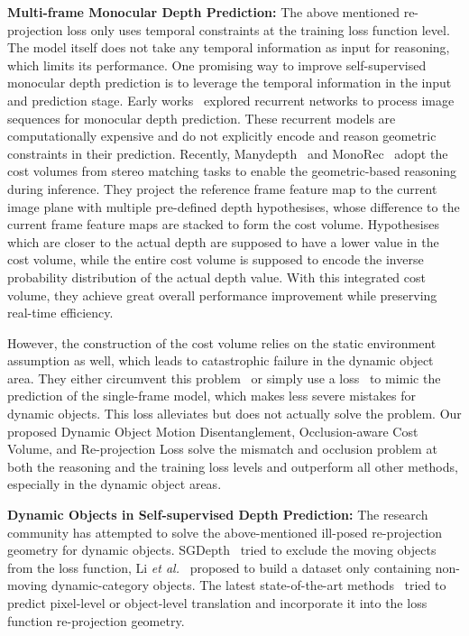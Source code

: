 \documentclass[runningheads]{llncs}
\newcommand{\etal}{\textit{et al.}}
\begin{document}
\textbf{Multi-frame Monocular Depth Prediction: }The above mentioned re-projection loss only uses temporal constraints at the training loss function level. The model itself does not take any temporal information as input for reasoning, which limits its performance. One promising way to improve self-supervised monocular depth prediction is to leverage the temporal information in the input and prediction stage. Early works~\cite{cs2018depthnet,patil2020dont,wang2019recurrent,zhang2019exploiting} explored recurrent networks to process image sequences for monocular depth prediction. These recurrent models are computationally expensive and do not explicitly encode and reason geometric constraints in their prediction. Recently, Manydepth~\cite{manydepth} and MonoRec~\cite{monorec} adopt the cost volumes from stereo matching tasks to enable the geometric-based reasoning during inference. They project the reference frame feature map to the current image plane with multiple pre-defined depth hypothesises, whose difference to the current frame feature maps are stacked to form the cost volume. Hypothesises which are closer to the actual depth are supposed to have a lower value in the cost volume, while the entire cost volume is supposed to encode the inverse probability distribution of the actual depth value. With this integrated cost volume, they achieve great overall performance improvement while preserving real-time efficiency. 

However, the construction of the cost volume relies on the static environment assumption as well, which leads to catastrophic failure in the dynamic object area. They either circumvent this problem~\cite{monorec} or simply use a  loss~\cite{manydepth} to mimic the prediction of the single-frame model, which makes less severe mistakes for dynamic objects. This  loss alleviates but does not actually solve the problem. Our proposed Dynamic Object Motion Disentanglement, Occlusion-aware Cost Volume, and Re-projection Loss solve the mismatch and occlusion problem at both the reasoning and the training loss levels and outperform all other methods, especially in the dynamic object areas.

\textbf{Dynamic Objects in Self-supervised Depth Prediction: }The research community has attempted to solve the above-mentioned ill-posed re-projection geometry for dynamic objects. SGDepth~\cite{sgdepth} tried to exclude the moving objects from the loss function, Li \etal~\cite{frozen} proposed to build a dataset only containing non-moving dynamic-category objects. The latest state-of-the-art methods~\cite{casser2018depth,gao2020attentional,gordon2019depth,instadm,lee2021attentive,li2020unsupervised} tried to predict pixel-level or object-level translation and incorporate it into the loss function re-projection geometry. 
\end{document}
